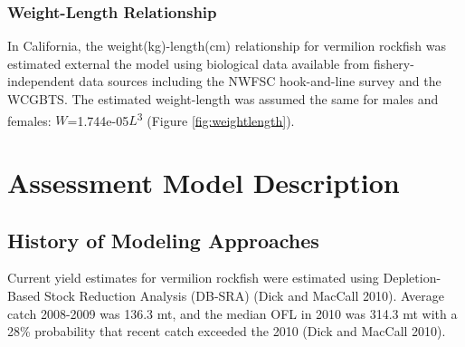 \documentclass[11pt,
  english,
  a4paper,
]{article}
\begin{document}

\hypertarget{weight-length-relationship}{%
\subsubsection{Weight-Length Relationship}\label{weight-length-relationship}}

\leavevmode\tagmcend\tagstructend

In California, the weight(kg)-length(cm) relationship for vermilion rockfish was estimated external the model using biological data available from fishery-independent data sources including the NWFSC hook-and-line survey and the WCGBTS. The estimated weight-length was assumed the same for males and females: {\(W\)\leavevmode\tagmcend\tagstructend}=1.744e-05{\(L\)\leavevmode\tagmcend\tagstructend}\textsuperscript{3} (Figure \ref{fig:weightlength}).


\hypertarget{assessment-model-description}{%
\section{Assessment Model Description}\label{assessment-model-description}}

\leavevmode\tagmcend\tagstructend


\hypertarget{history-of-modeling-approaches}{%
\subsection{History of Modeling Approaches}\label{history-of-modeling-approaches}}

\leavevmode\tagmcend\tagstructend

Current yield estimates for vermilion rockfish were estimated using Depletion-Based Stock Reduction Analysis (DB-SRA) {(Dick and MacCall 2010)\leavevmode\tagmcend\tagstructend}. Average catch 2008-2009 was 136.3 mt, and the median OFL in 2010 was 314.3 mt with a 28\% probability that recent catch exceeded the 2010 {(Dick and MacCall 2010)\leavevmode\tagmcend\tagstructend}.
\end{document}
